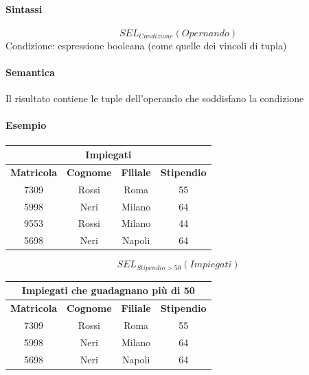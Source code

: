 \documentclass[../main.tex]{subfiles}
\begin{document}
	\paragraph{Sintassi}
	\[SEL_{Condizione}(Opernando)\]
	Condizione: espressione booleana (come quelle dei vincoli di tupla)
	\paragraph{Semantica}
	Il risultato contiene le tuple dell'operando che soddisfano la condizione
	\paragraph{Esempio}
	\begin{center}
		\begin{tabular}{ |c|c|c|c| }
			\hline
			\multicolumn{4}{|c|}{Impiegati}\\
			\hline
			\textbf{Matricola} & \textbf{Cognome} & \textbf{Filiale} & \textbf{Stipendio}\\
			\hline
			7309 & Rossi & Roma & 55\\
			5998 & Neri & Milano & 64\\
			9553 & Rossi & Milano & 44\\
			5698 & Neri & Napoli & 64\\
			\hline
		\end{tabular}
	\end{center}
	\[SEL_{Stipendio>50}(Impiegati)\]
	\begin{center}
		\begin{tabular}{ |c|c|c|c| }
			\hline
			\multicolumn{4}{|c|}{Impiegati che guadagnano più di 50}\\
			\hline
			\textbf{Matricola} & \textbf{Cognome} & \textbf{Filiale} & \textbf{Stipendio}\\
			\hline
			7309 & Rossi & Roma & 55\\
			5998 & Neri & Milano & 64\\
			5698 & Neri & Napoli & 64\\
			\hline
		\end{tabular}
	\end{center}
\end{document}

